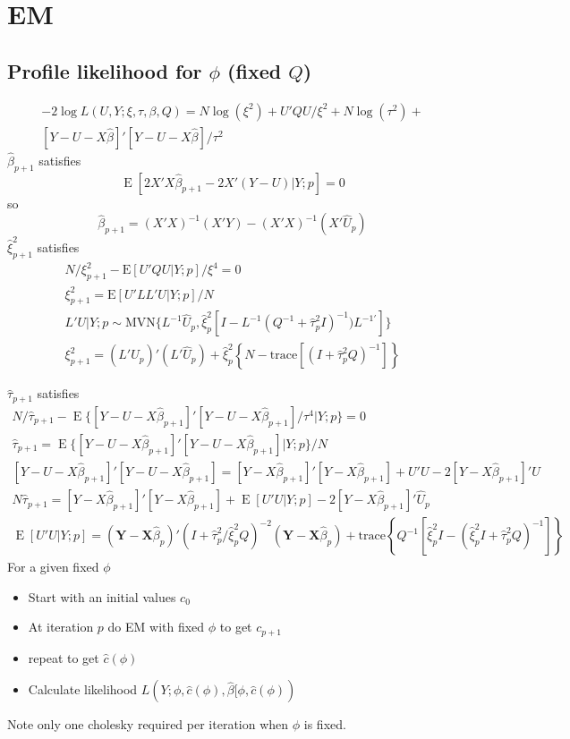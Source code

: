 \documentclass[12pt]{article}
\DeclareMathOperator{\E}{E}
\begin{document}
\section*{EM}

\subsection*{Profile likelihood for $\phi$ (fixed $Q$)}
\begin{multline*}
-2 \log L(U,Y;\xi,\tau,\beta,Q) = 
	N\log(\xi^2) + U'Q U/\xi^2 + 
	N\log(\tau^2) +\\
	[Y-U-X\hat\beta]'[Y-U-X\hat\beta]/\tau^2
	\end{multline*}
$\hat\beta_{p+1}$ satisfies
\[
\E[ 2  X' X \hat\beta_{p+1} - 2 X'(Y - U) |Y ; p] = 0
 \]
 so
\[
 \hat\beta_{p+1} = (X'X)^{-1}(X'Y) - (X'X)^{-1}(X'\hat U_p)
\]
$\hat\xi^2_{p+1}$ satisfies
\begin{gather*}
N/\xi^2_{p+1} - \text{E}[ U'Q U |Y; p ]/\xi^4 = 0\\
\xi^2_{p+1} = \text{E}[ U'L L' U |Y; p ]/N\\
L'U|Y;p \sim  \text{MVN}\{
	L^{-1}\hat U_p, 
\hat\xi_p^2[I - L^{-1}( Q^{-1} + \hat\tau_p^2 I  )^{-1}) L^{-1\prime}] \}\\
\xi^2_{p+1} = (L' \hat U_p )'(L'\hat U_p) + \hat\xi_p^2\left\{N-  
\text{trace}\left[(I + \hat\tau_p^2 Q  )^{-1} \right]\right\}
\end{gather*}

$\hat\tau_{p+1}$ satisfies
\begin{gather*}
N /\hat\tau_{p+1} - 
\E\{[Y-U-X\hat\beta_{p+1}]'[Y-U-X\hat\beta_{p+1}]/\tau^4|Y;p\}=0\\
\hat\tau_{p+1} = \E\{[Y-U-X\hat\beta_{p+1}]'[Y-U-X\hat\beta_{p+1}]|Y;p\}/N\\
[Y-U-X\hat\beta_{p+1}]'[Y-U-X\hat\beta_{p+1}]=
[Y-X\hat\beta_{p+1}]'[Y-X\hat\beta_{p+1}]
+ U'U -2 [Y-X\hat\beta_{p+1}]' U \\
N \hat\tau_{p+1} = [Y-X\hat\beta_{p+1}]'[Y-X\hat\beta_{p+1}]+
\E[U'U|Y;p] - 2 [Y-X\hat\beta_{p+1}]' \hat U_p\\
\E[U'U|Y;p] = (\mathbf{Y} -
\mathbf{X}\hat\beta_p)' ( I + \hat\tau^2_p/\hat\xi^2_p Q  )^{-2}  (\mathbf{Y} -
\mathbf{X}\hat\beta_p) + \text{trace}\left\{ Q^{-1}\left[\hat\xi_p^2 I-
(\hat\xi_p^2  I + \hat\tau_p^2Q )^{-1} \right]\right\}
\end{gather*}
For a given fixed $\phi$
\begin{itemize}
  \item Start with an initial values  $c_0$
  \item At iteration $p$  do EM with fixed $\phi$ to get $c_{p+1}$ 
  \item repeat to get $\hat c(\phi)$
  \item Calculate likelihood 
  $L(Y;\phi,\hat c(\phi), \hat\beta[\phi,\hat c(\phi)) $
\end{itemize}
Note only one cholesky required per iteration when $\phi$ is fixed.
\end{document}
